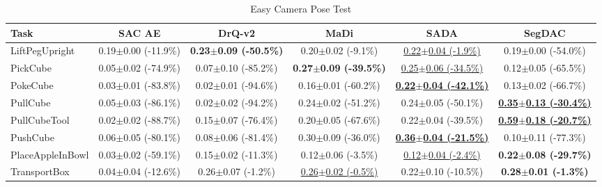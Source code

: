 \begin{table}[htbp]
\centering
\scriptsize
\caption{Easy Camera Pose Test}
\label{tab:appendix_cameraposetest_easy}
\begin{adjustbox}{max width=\textwidth}
\begin{tabular}{l*{5}{c}}
\toprule
\textbf{Task} & \textbf{SAC AE} & \textbf{DrQ-v2} & \textbf{MaDi} & \textbf{SADA} & \textbf{SegDAC} \\
\midrule
LiftPegUpright & 0.19$\pm$0.00 \scriptsize{(-11.9\%)} & \textbf{0.23$\pm$0.09 \scriptsize{(-50.5\%)}} & 0.20$\pm$0.02 \scriptsize{(-9.1\%)} & \underline{0.22$\pm$0.04 \scriptsize{(-1.9\%)}} & 0.19$\pm$0.00 \scriptsize{(-54.0\%)} \\
PickCube & 0.05$\pm$0.02 \scriptsize{(-74.9\%)} & 0.07$\pm$0.10 \scriptsize{(-85.2\%)} & \textbf{0.27$\pm$0.09 \scriptsize{(-39.5\%)}} & \underline{0.25$\pm$0.06 \scriptsize{(-34.5\%)}} & 0.12$\pm$0.05 \scriptsize{(-65.5\%)} \\
PokeCube & 0.03$\pm$0.01 \scriptsize{(-83.8\%)} & 0.02$\pm$0.01 \scriptsize{(-94.6\%)} & 0.16$\pm$0.01 \scriptsize{(-60.2\%)} & \textbf{\underline{0.22$\pm$0.04 \scriptsize{(-42.1\%)}}} & 0.13$\pm$0.02 \scriptsize{(-66.7\%)} \\
PullCube & 0.05$\pm$0.03 \scriptsize{(-86.1\%)} & 0.02$\pm$0.02 \scriptsize{(-94.2\%)} & 0.24$\pm$0.02 \scriptsize{(-51.2\%)} & 0.24$\pm$0.05 \scriptsize{(-50.1\%)} & \textbf{\underline{0.35$\pm$0.13 \scriptsize{(-30.4\%)}}} \\
PullCubeTool & 0.02$\pm$0.02 \scriptsize{(-88.7\%)} & 0.15$\pm$0.07 \scriptsize{(-76.4\%)} & 0.20$\pm$0.05 \scriptsize{(-67.6\%)} & 0.22$\pm$0.04 \scriptsize{(-39.5\%)} & \textbf{\underline{0.59$\pm$0.18 \scriptsize{(-20.7\%)}}} \\
PushCube & 0.06$\pm$0.05 \scriptsize{(-80.1\%)} & 0.08$\pm$0.06 \scriptsize{(-81.4\%)} & 0.30$\pm$0.09 \scriptsize{(-36.0\%)} & \textbf{\underline{0.36$\pm$0.04 \scriptsize{(-21.5\%)}}} & 0.10$\pm$0.11 \scriptsize{(-77.3\%)} \\
PlaceAppleInBowl & 0.03$\pm$0.02 \scriptsize{(-59.1\%)} & 0.15$\pm$0.02 \scriptsize{(-11.3\%)} & 0.12$\pm$0.06 \scriptsize{(-3.5\%)} & \underline{0.12$\pm$0.04 \scriptsize{(-2.4\%)}} & \textbf{0.22$\pm$0.08 \scriptsize{(-29.7\%)}} \\
TransportBox & 0.04$\pm$0.04 \scriptsize{(-12.6\%)} & 0.26$\pm$0.07 \scriptsize{(-1.2\%)} & \underline{0.26$\pm$0.02 \scriptsize{(-0.5\%)}} & 0.22$\pm$0.10 \scriptsize{(-10.5\%)} & \textbf{0.28$\pm$0.01 \scriptsize{(-1.3\%)}} \\
\bottomrule
\end{tabular}
\end{adjustbox}
\end{table}

